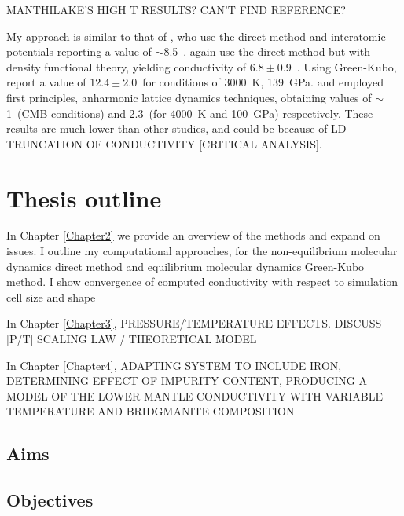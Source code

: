 MANTHILAKE'S HIGH T RESULTS? CAN'T FIND REFERENCE?

My approach is similar to that of \citet{Ammann2014}, who use the direct method and interatomic potentials reporting a value of $\sim$8.5~\wmk. \citet{Stackhouse2015} again use the direct method but with density functional theory, yielding conductivity of $6.8\pm0.9$~\wmk. Using Green-Kubo, \citet{Haigis2013} report a value of $12.4\pm2.0$~\wmks for conditions of 3000~K, 139~GPa. \citet{Tang2014} and \citet{Dekura2013} employed first principles, anharmonic lattice dynamics techniques, obtaining values of $\sim$1~\wmks (CMB conditions) and 2.3~\wmks (for 4000~K and 100~GPa) respectively. These results are much lower than other studies, and could be because of LD TRUNCATION OF CONDUCTIVITY [CRITICAL ANALYSIS].



\section{Thesis outline}
In Chapter \ref{Chapter2} we provide an overview of the methods and expand on issues. I outline my computational approaches, for the non-equilibrium molecular dynamics direct method and equilibrium molecular dynamics Green-Kubo method. I show convergence of computed conductivity with respect to simulation cell size and shape 

In Chapter \ref{Chapter3}, PRESSURE/TEMPERATURE EFFECTS. DISCUSS [P/T] SCALING LAW / THEORETICAL MODEL

In Chapter \ref{Chapter4}, ADAPTING SYSTEM TO INCLUDE IRON, DETERMINING EFFECT OF IMPURITY CONTENT, PRODUCING A MODEL OF THE LOWER MANTLE CONDUCTIVITY WITH VARIABLE TEMPERATURE AND BRIDGMANITE COMPOSITION

\subsection{Aims}

\subsection{Objectives}


